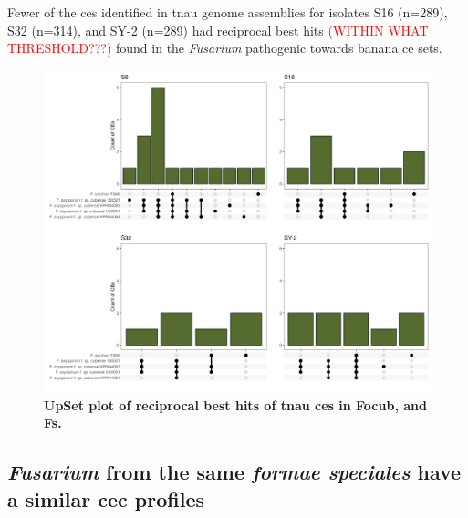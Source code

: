 Fewer of the \acp{ce} identified in \ac{tnau} genome assemblies for isolates S16 (n=289), S32 (n=314), and SY-2 (n=289) had reciprocal best hits \textcolor{red}{(WITHIN WHAT THRESHOLD???)} found in the \textit{Fusarium} pathogenic towards banana \ac{ce} sets.

\begin{figure}[ht!]
    \centering
    \includegraphics[width=\textwidth]{Figures/UpSetPlots.png}
    \caption[UpSet plot of reciprocal best hits of \ac{tnau} \acp{ce}  in \ac{Focub}, and \ac{Fs}.]{\textbf{UpSet plot of reciprocal best hits of \ac{tnau} \acp{ce}  in \ac{Focub}, and \ac{Fs}.}}
    \label{fig:RBHupsets}
\end{figure}

\subsection{\textit{Fusarium} from the same \textit{formae speciales} have a similar \acl{cec} profiles}

